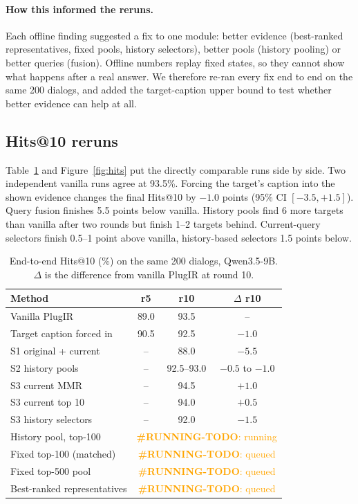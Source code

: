 \documentclass[sigconf,nonacm]{acmart}
\newcommand{\runningtodo}[1]{\textcolor{orange}{\textbf{\#RUNNING-TODO}: #1}}
\begin{document}
\paragraph{How this informed the reruns.} Each offline finding suggested a fix to one module:
better evidence (best-ranked representatives, fixed pools, history selectors), better pools
(history pooling) or better queries (fusion). Offline numbers replay fixed states, so they cannot
show what happens after a real answer. We therefore re-ran every fix end to end on the same 200
dialogs, and added the target-caption upper bound to test whether better evidence can help at all.

\subsection{Hits@10 reruns}
\label{sec:reruns}
Table~\ref{tab:live} and Figure~\ref{fig:hits} put the directly comparable runs side by side. Two
independent vanilla runs agree at 93.5\%. Forcing the target's caption into the shown evidence
changes the final Hits@10 by $-1.0$ points (95\% CI $[-3.5,+1.5]$). Query fusion finishes 5.5
points below vanilla. History pools find 6 more targets than vanilla after two rounds but finish
1--2 targets behind. Current-query selectors finish 0.5--1 point above vanilla, history-based
selectors 1.5 points below.

\begin{table}[t]
\caption{End-to-end Hits@10 (\%) on the same 200 dialogs, Qwen3.5-9B. $\Delta$ is the
difference from vanilla PlugIR at round 10.}
\label{tab:live}
\small\setlength{\tabcolsep}{4pt}
\begin{tabular}{@{}lccc@{}}
\toprule
Method & r5 & r10 & $\Delta$ r10 \\
\midrule
Vanilla PlugIR & 89.0 & 93.5 & -- \\
Target caption forced in & 90.5 & 92.5 & $-1.0$ \\
S1 original + current & -- & 88.0 & $-5.5$ \\
S2 history pools & -- & 92.5--93.0 & $-0.5$ to $-1.0$ \\
S3 current MMR & -- & 94.5 & $+1.0$ \\
S3 current top 10 & -- & 94.0 & $+0.5$ \\
S3 history selectors & -- & 92.0 & $-1.5$ \\
\midrule
History pool, top-100 & \multicolumn{3}{c}{\runningtodo{running}} \\
Fixed top-100 (matched) & \multicolumn{3}{c}{\runningtodo{queued}} \\
Fixed top-500 pool & \multicolumn{3}{c}{\runningtodo{queued}} \\
Best-ranked representatives & \multicolumn{3}{c}{\runningtodo{queued}} \\
\bottomrule
\end{tabular}
\end{table}
\end{document}
